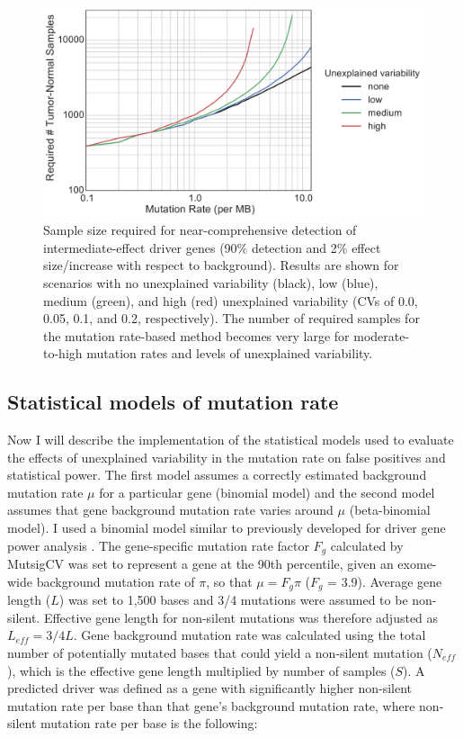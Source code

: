 \begin{figure}
  \centering
  \makeatletter
  \let\@currsize\normalsize
  \includegraphics[width=0.9\linewidth]{figures/chapter2/statistical_power.pdf}
  \caption[Sample size required for near-comprehensive detection of driver genes]{Sample size required for near-comprehensive detection of intermediate-effect driver genes (90\% detection and 2\% effect size/increase with respect to background). Results are shown for scenarios with no unexplained variability (black), low (blue), medium (green), and high (red) unexplained variability (CVs of 0.0, 0.05, 0.1, and 0.2, respectively). The number of required samples for the mutation rate-based method becomes very large for moderate-to-high mutation rates and levels of unexplained variability.}
  \label{fig:statistical_power}
\end{figure}

\subsection{Statistical models of mutation rate}
\label{sec:stat_models}

Now I will describe the implementation of the statistical models used to evaluate the effects of unexplained variability in the mutation rate on false positives and statistical power. The first model assumes a correctly estimated background mutation rate $\mu$ for a particular gene (binomial model) and the second model assumes that gene background mutation rate varies around $\mu$ (beta-binomial model). I used a binomial model similar to previously developed for driver gene power analysis \cite{RN14}. The gene-specific mutation rate factor $F_g$ calculated by MutsigCV \cite{RN14} was set to represent a gene at the 90th percentile, given an exome-wide background mutation rate of $\pi$, so that $\mu=F_g\pi$ ($F_g$ = 3.9). Average gene length ($L$) was set to 1,500 bases and 3/4 mutations were assumed to be non-silent. Effective gene length for non-silent mutations was therefore adjusted as $L_{eff}=3/4L$. Gene background mutation rate was calculated using the total number of potentially mutated bases that could yield a non-silent mutation ($N_{eff}$), which is the effective gene length multiplied by number of samples ($S$). A predicted driver was defined as a gene with significantly higher non-silent mutation rate per base than that gene's background mutation rate, where non-silent mutation rate per base is the following:

